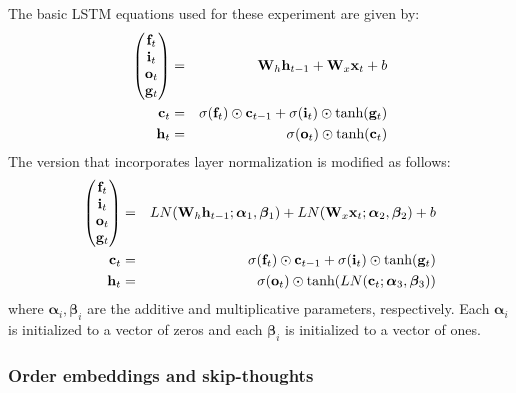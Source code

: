 \documentclass{article}
\begin{document}
The basic LSTM equations used for these experiment are given by:
%
\begin{eqnarray}
\begin{pmatrix}{\bf f}_t\\{\bf i}_t\\{\bf o}_t\\{\bf g}_t\end{pmatrix} &=& {\bf W}_h {\bf h}_{t-1} + {\bf W}_x {\bf x}_t + b \\
{\bf c}_t &=& \sigma({\bf f}_t) \odot {\bf c}_{t-1} + \sigma({\bf i}_t) \odot \text{tanh}({\bf g}_t) \\
{\bf h}_t &=& \sigma({\bf o}_t) \odot \text{tanh}({\bf c}_t)
\end{eqnarray}
%
The version that incorporates layer normalization is modified as follows:
%
\begin{eqnarray}
\begin{pmatrix}{\bf f}_t\\{\bf i}_t\\{\bf o}_t\\{\bf g}_t\end{pmatrix} &=& LN({\bf W}_h {\bf h}_{t-1}; \bm{\alpha}_1, \bm{\beta}_1) + LN({\bf W}_x {\bf x}_t; \bm{\alpha}_2, \bm{\beta}_2) + b \\
{\bf c}_t &=& \sigma({\bf f}_t) \odot {\bf c}_{t-1} + \sigma({\bf i}_t) \odot \text{tanh}({\bf g}_t) \\
{\bf h}_t &=& \sigma({\bf o}_t) \odot \text{tanh}(LN({\bf c}_t; \bm{\alpha}_3, \bm{\beta}_3))
\end{eqnarray}
%
where $\bm{\alpha}_i, \bm{\beta}_i$ are the additive and multiplicative parameters, respectively. Each $\bm{\alpha}_i$ is initialized to a vector of zeros and each $\bm{\beta}_i$ is initialized to a vector of ones.

\subsubsection*{Order embeddings and skip-thoughts}
\end{document}
